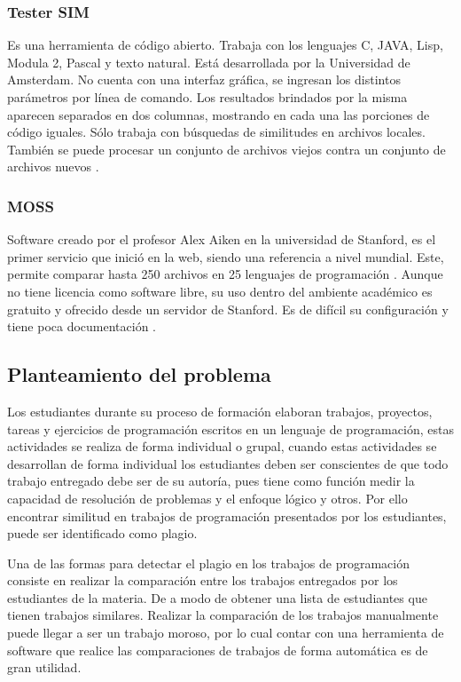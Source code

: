 \subsubsection{Tester SIM}
Es una herramienta de código abierto. Trabaja con los lenguajes C, JAVA, Lisp, Modula 2, Pascal y texto natural. Está desarrollada por la Universidad de Amsterdam. No cuenta con una interfaz gráfica, se ingresan los distintos parámetros por línea de comando. Los resultados brindados por la misma aparecen separados en dos columnas, mostrando en cada una las porciones de código iguales. Sólo trabaja con búsquedas de similitudes en archivos locales. También se puede procesar un conjunto de archivos viejos contra un conjunto de archivos nuevos  \cite{article1}.
\subsubsection{MOSS}
Software creado por el profesor Alex Aiken en la universidad de Stanford, es el primer servicio que inició en la web, siendo una referencia a nivel mundial. Este, permite comparar hasta 250 archivos en 25 lenguajes de programación \cite{Hage2010ACO}. Aunque no tiene licencia como software libre, su uso dentro del ambiente académico es gratuito y ofrecido desde un servidor de Stanford. Es de difícil su configuración y tiene poca documentación \cite{book1}.
\subsection{Planteamiento del problema}
Los estudiantes durante su proceso de formación elaboran trabajos, proyectos, tareas y ejercicios de programación escritos en un lenguaje de programación, estas actividades se realiza de forma individual o grupal, cuando estas actividades se desarrollan de forma individual los estudiantes deben ser conscientes de que todo trabajo entregado debe ser de su autoría, pues tiene como función medir la capacidad de resolución de problemas y el enfoque lógico y otros. Por ello encontrar similitud en trabajos de programación presentados por los estudiantes, puede ser identificado como plagio.

Una de las formas para detectar el plagio en los trabajos de programación consiste en realizar la comparación entre los trabajos entregados por los estudiantes de la materia. De a modo de obtener una lista de estudiantes que tienen trabajos similares. Realizar la comparación de los trabajos manualmente puede llegar a ser un trabajo moroso, por lo cual contar con una herramienta de software que realice las comparaciones de trabajos de forma automática es de gran utilidad.

